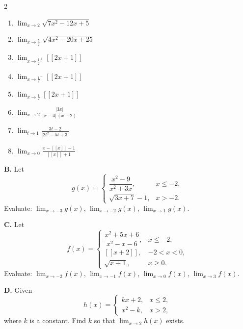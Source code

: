 \begin{multicols}{2}
\begin{enumerate}[label=\arabic*., nosep, topsep=0pt, itemsep=2pt]
    \item \(\displaystyle\lim_{x \to 2} \sqrt{7x^{2} - 12x + 5}\)
    \item \(\displaystyle\lim_{x \to \frac{5}{2}} \sqrt{4x^{2} - 20x + 25}\)
    \item \(\displaystyle\lim_{x \to \frac{1}{2}^{+}} [\![2x + 1]\!]\)
    \item \(\displaystyle\lim_{x \to \frac{1}{2}^{-}} [\![2x + 1]\!]\)
    \item \(\displaystyle\lim_{x \to \frac{1}{2}} [\![2x + 1]\!]\)
    \item \(\displaystyle\lim_{x \to 2} \frac{|3x|}{|x - 4|\,(x - 2)}\)
    \item \(\displaystyle\lim_{t \to 1} \frac{3t - 2}{|2t^{2} - 5t + 3|}\)
    \item \(\displaystyle\lim_{x \to 0} \frac{x - [\![x]\!] - 1}{[\![x]\!] + 1}\)
\end{enumerate}
\end{multicols}

\medskip
\noindent\textbf{B.} Let
\[
g(x) = \begin{cases}
\dfrac{x^{2} - 9}{x^{2} + 3x}, & x \le -2, \\[10pt]
\sqrt{3x + 7} - 1,               & x > -2.
\end{cases}
\]
Evaluate: \(\displaystyle\lim_{x \to -3} g(x)\), \quad \(\displaystyle\lim_{x \to -2} g(x)\), \quad \(\displaystyle\lim_{x \to 1} g(x)\).

\medskip
\noindent\textbf{C.} Let
\[
f(x) = \begin{cases}
\dfrac{x^{2} + 5x + 6}{x^{2} - x - 6}, & x \le -2, \\[10pt]
[\![x + 2]\!],                           & -2 < x < 0, \\[6pt]
\sqrt{x + 1},                            & x \ge 0.
\end{cases}
\]
Evaluate: \(\displaystyle\lim_{x \to -2} f(x)\), \quad \(\displaystyle\lim_{x \to -1} f(x)\), \quad \(\displaystyle\lim_{x \to 0} f(x)\), \quad \(\displaystyle\lim_{x \to 3} f(x)\).

\medskip
\noindent\textbf{D.} Given
\[
h(x) = \begin{cases}
kx + 2,   & x \le 2, \\[4pt]
x^{2} - k, & x > 2,
\end{cases}
\]
where \(k\) is a constant. Find \(k\) so that \(\displaystyle\lim_{x \to 2} h(x)\) exists.


